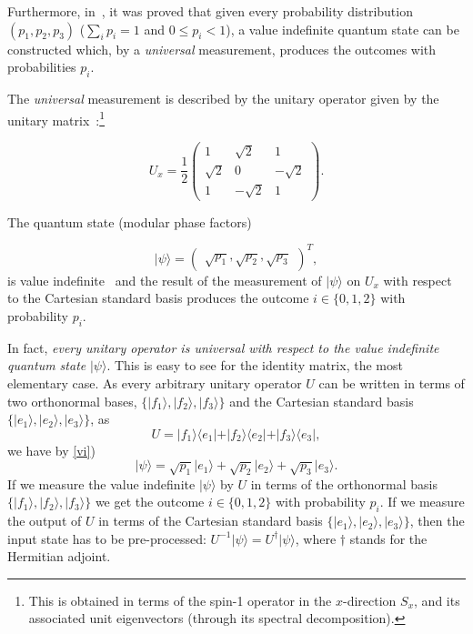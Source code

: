 \documentclass[%
 reprint,
 superscriptaddress,
 showpacs,
 showkeys,
 nofootinbib,
  amsmath,amssymb,
 pra,
  longbibliography,
  floatfix,
 ]{revtex4-2}
\theoremstyle{definition}
\begin{document}
Furthermore, in~\cite{RSPA23}, it was proved that
 given every probability distribution $(p_1,p_2,p_3)$ ($\sum_{i}p_i=1$ and $0\le  p_i < 1$), a value indefinite quantum state can be constructed which, by a {\it universal} measurement, produces the
outcomes with probabilities $p_i$.



 The {\it universal} measurement is described
by the unitary operator given by the unitary matrix~\cite{RSPA23}:\footnote{This is obtained in terms of the spin-1 operator in the $x$-direction $S_x$, and its associated unit eigenvectors (through its spectral decomposition).}

\begin{equation}
U_x =\frac{1}{2}
\begin{pmatrix}
1 & \sqrt{2} & 1\\
\sqrt{2} & 0 & -\sqrt{2}\\
1 & -\sqrt{2} & 1
\end{pmatrix}.
\label{2023-ux}
\end{equation}


\noindent The quantum state
(modular phase factors)

\begin{equation}
\label{vi}
\vert \psi \rangle=\begin{pmatrix}\sqrt{p_1},\sqrt{p_2},\sqrt{p_3}\end{pmatrix}^T,
\end{equation}
is value indefinite~\cite[Theorem 4.1.]{RSPA23} and the result of the measurement of $\vert \psi \rangle$ on $U_x$ with respect to the Cartesian standard basis produces the outcome
 $i\in \{0,1,2\}$ with probability $p_i$.

In fact, {\it every unitary operator is universal with respect to the value indefinite quantum state} $\vert \psi \rangle$. This is easy to see for
the identity matrix, the most elementary case. %
As every arbitrary unitary operator $U$  can be written in terms of two orthonormal bases,
$\{ \vert f_1 \rangle, \vert f_2 \rangle , \vert f_3 \rangle  \}$
and the  Cartesian standard basis $\{ \vert e_1 \rangle, \vert e_2 \rangle , \vert e_3 \rangle  \}$,
as
$$U=
\vert f_1\rangle \langle e_1\vert +
\vert f_2\rangle \langle e_2\vert +
\vert f_3\rangle \langle e_3\vert ,$$
 we have by {\ref{vi})
\begin{equation}
\vert \psi \rangle =
\sqrt{p_1}\vert e_1 \rangle + \sqrt{p_2}\vert e_2 \rangle + \sqrt{p_3}\vert e_3 \rangle.
\end{equation}
If we measure the value indefinite $\vert \psi \rangle$ by $U$
in terms of the orthonormal basis
$\{ \vert f_1 \rangle, \vert f_2 \rangle , \vert f_3 \rangle  \}$
}
we get the outcome
 $i\in \{0,1,2\}$ with probability $p_i$.
 If we  measure the output of $U$ in terms of the
Cartesian standard basis $\{ \vert e_1 \rangle, \vert e_2 \rangle , \vert e_3 \rangle  \}$, then the input state has to be pre-processed: %
$U^{-1}\vert \psi \rangle = U^\dagger \vert \psi \rangle$, where $\dagger$ stands for the  Hermitian adjoint.
\end{document}
